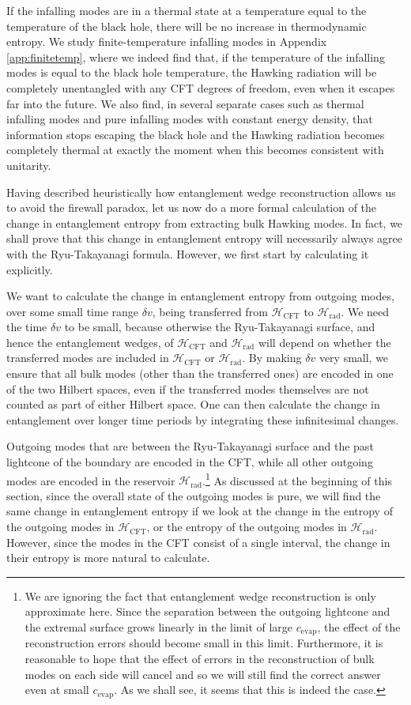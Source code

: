 \documentclass[12pt]{article}
\begin{document}
If the infalling modes are in a thermal state at a temperature equal to the temperature of the black hole, there will be no increase in thermodynamic entropy. We study finite-temperature infalling modes in Appendix \ref{app:finitetemp}, where we indeed find that, if the temperature of the infalling modes is equal to the black hole temperature, the Hawking radiation will be completely unentangled with any CFT degrees of freedom, even when it escapes far into the future. We also find, in several separate cases such as thermal infalling modes and pure infalling modes with constant energy density, that information stops escaping the black hole and the Hawking radiation becomes completely thermal at exactly the moment when this becomes consistent with unitarity.

Having described heuristically how entanglement wedge reconstruction allows us to avoid the firewall paradox, let us now do a more formal calculation of the change in entanglement entropy from extracting bulk Hawking modes. In fact, we shall prove that this change in entanglement entropy will necessarily always agree with the Ryu-Takayanagi formula. However, we first start by calculating it explicitly.

We want to calculate the change in entanglement entropy from outgoing modes, over some small time range $\delta v$, being transferred from $\mathcal{H}_\text{CFT}$ to $\mathcal{H}_\text{rad}$. We need the time $\delta v$ to be small, because otherwise the Ryu-Takayanagi surface, and hence the entanglement wedges, of $\mathcal{H}_\text{CFT}$ and $\mathcal{H}_\text{rad}$ will depend on whether the transferred modes are included in $\mathcal{H}_\text{CFT}$ or $\mathcal{H}_\text{rad}$. By making $\delta v$ very small, we ensure that all bulk modes (other than the transferred ones) are encoded in one of the two Hilbert spaces, even if the transferred modes themselves are not counted as part of either Hilbert space. One can then calculate the change in entanglement over longer time periods by integrating these infinitesimal changes.

Outgoing modes that are between the Ryu-Takayanagi surface and the past lightcone of the boundary are encoded in the CFT, while all other outgoing modes are encoded in the reservoir $\mathcal{H}_\text{rad}$.\footnote{We are ignoring the fact that entanglement wedge reconstruction is only approximate here. Since the separation between the outgoing lightcone and the extremal surface grows linearly  in the limit of large $c_\text{evap}$, the effect of the reconstruction errors should become small in this limit. Furthermore, it is reasonable to hope that the effect of errors in the reconstruction of bulk modes on each side will cancel and so we will still find the correct answer even at small $c_\text{evap}$. As we shall see, it seems that this is indeed the case.}  As discussed at the beginning of this section, since the overall state of the outgoing modes is pure, we will find the same change in entanglement entropy if we look at the change in the entropy of the outgoing modes in $\mathcal{H}_\text{CFT}$, or the entropy of the outgoing modes in $\mathcal{H}_\text{rad}$. However, since the modes in the CFT consist of a single interval, the change in their entropy is more natural to calculate.
\end{document}
